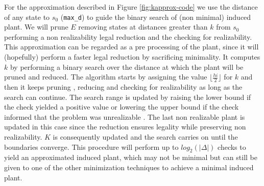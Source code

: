 For the approximation described in Figure \ref{fig:kapprox-code}
we use the distance of any state to $s_0$ (\texttt{max\_d}) to guide the binary search of (non minimal) induced plant.  We will prune $E$ removing states
at distances greater than $k$ from $s_0$ performing a non realizability legal
reduction and the checking for realizability.
This approximation can be regarded as a pre processing of the plant, since it
will (hopefully) perform a faster legal reduction by sacrificing minimality.
It computes $k$ by performing a binary search over the distance at which the
plant will be pruned and reduced.  The algorithm starts by assigning the
value $\lfloor \frac{hi}{2}\rfloor$  for $k$ 
and then it keeps pruning , reducing  and checking
for realizability  as long as the search can continue.  The search
range is updated by raising the lower bound if the check yielded a positive 
value  or lowering the upper bound if the check informed that the
problem was unrealizable .  The last non realizable plant is updated 
in this case since the reduction ensures legality while preserving 
non realizability.  $K$ is consequently updated  and the search
carries on until the boundaries converge.  This procedure will perform
up to $log_2(|\Delta|)$ checks to yield an approximated induced plant, which
may not be minimal but can still be given to one of the other minimization
techniques to achieve a minimal induced plant.



%     

